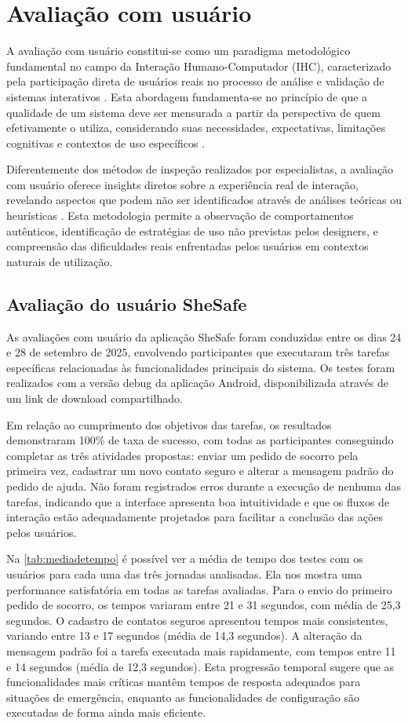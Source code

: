 \section{Avaliação com usuário}
A avaliação com usuário constitui-se como um paradigma metodológico fundamental no campo da Interação Humano-Computador (IHC), caracterizado pela participação direta de usuários reais no processo de análise e validação de sistemas interativos \cite{dix2003human}. Esta abordagem fundamenta-se no princípio de que a qualidade de um sistema deve ser mensurada a partir da perspectiva de quem efetivamente o utiliza, considerando suas necessidades, expectativas, limitações cognitivas e contextos de uso específicos \cite{preece2015interaction}.

Diferentemente dos métodos de inspeção realizados por especialistas, a avaliação com usuário oferece insights diretos sobre a experiência real de interação, revelando aspectos que podem não ser identificados através de análises teóricas ou heurísticas \cite{nielsen1994usability}. Esta metodologia permite a observação de comportamentos autênticos, identificação de estratégias de uso não previstas pelos designers, e compreensão das dificuldades reais enfrentadas pelos usuários em contextos naturais de utilização.
\subsection{Avaliação do usuário SheSafe}

As avaliações com usuário da aplicação SheSafe foram conduzidas entre os dias 24 e 28 de setembro de 2025, envolvendo participantes que executaram três tarefas específicas relacionadas às funcionalidades principais do sistema. Os testes foram realizados com a versão debug da aplicação Android, disponibilizada através de um link de download compartilhado.

Em relação ao cumprimento dos objetivos das tarefas, os resultados demonstraram 100\% de taxa de sucesso, com todas as participantes conseguindo completar as três atividades propostas: enviar um pedido de socorro pela primeira vez, cadastrar um novo contato seguro e alterar a mensagem padrão do pedido de ajuda. Não foram registrados erros durante a execução de nenhuma das tarefas, indicando que a interface apresenta boa intuitividade e que os fluxos de interação estão adequadamente projetados para facilitar a conclusão das ações pelos usuários.

Na \autoref{tab:mediadetempo} é possível ver a média de tempo dos testes com os usuários para cada uma das três jornadas analisadas. Ela nos mostra uma performance satisfatória em todas as tarefas avaliadas. Para o envio do primeiro pedido de socorro, os tempos variaram entre 21 e 31 segundos, com média de 25,3 segundos. O cadastro de contatos seguros apresentou tempos mais consistentes, variando entre 13 e 17 segundos (média de 14,3 segundos). A alteração da mensagem padrão foi a tarefa executada mais rapidamente, com tempos entre 11 e 14 segundos (média de 12,3 segundos). Esta progressão temporal sugere que as funcionalidades mais críticas mantêm tempos de resposta adequados para situações de emergência, enquanto as funcionalidades de configuração são executadas de forma ainda mais eficiente.

